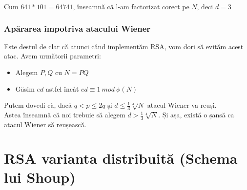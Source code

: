 \documentclass[12]{article}
\begin{document}
Cum $641 * 101 = 64741$, înseamnă că l-am factorizat corect pe $N$, deci $d=3$
\subsubsection{Apărarea împotriva atacului Wiener}
Este destul de clar că atunci când implementăm RSA, vom dori să evităm acest atac. Avem următorii parametri: \\
\begin{itemize}
\item Alegem $P,Q$ cu $N=PQ$

\item Găsim $ed$ astfel încât $ed \equiv 1 \ mod \ \phi(N)$

\end{itemize}
Putem dovedi că, dacă $q<p \leqslant 2q$ și $ d \leqslant \frac{1}{3} \sqrt[4]{N}$ atacul Wiener va reuși. \\
Astea înseamnă că noi trebuie să alegem $d > \frac{1}{3} \sqrt[4]{N}$. Și așa, există o șansă ca atacul Wiener să reușească.

\section{RSA varianta distribuită (Schema lui Shoup)}
\end{document}
